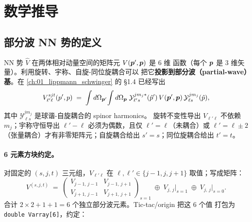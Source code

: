 \section{数学推导}
\label{sec:ch08-math}

\subsection{部分波 NN 势的定义}
\label{subsec:ch08-pw-NN-def}

NN 势 \(\hat{V}\) 在两体相对动量空间的矩阵元 \(V(\bm{p}', \bm{p})\) 是 6 维
函数（每个 \(\bm{p}\) 是 3 维矢量）。利用旋转、宇称、自旋-同位旋耦合可以
把它\textbf{投影到部分波（partial-wave）基}。在 \cref{ch:01_lippmann_schwinger}
的 §1.4 已经写出
\begin{equation}
\label{eq:ch08-pw-projection}
V_{\ell' \ell}^{s j t}(p', p) \;=\;
\int d\Omega_{\bm{p}'}\!\int d\Omega_{\bm{p}}\;
\mathcal{Y}_{\ell' s}^{j m_j *}(\hat{p}')\,
V(\bm{p}', \bm{p})\,
\mathcal{Y}_{\ell s}^{j m_j}(\hat{p}),
\end{equation}
其中 \(\mathcal{Y}_{\ell s}^{j m_j}\) 是球谐-自旋耦合的 spinor harmonics。
旋转不变性导出 \(V_{\ell' \ell}\) 不依赖 \(m_j\)；宇称守恒导出
\(\ell' - \ell\) 必须为偶数，且仅 \(\ell' = \ell\)（未耦合）或 \(\ell' = \ell \pm 2\)
（张量耦合）才有非零矩阵元；自旋耦合给出 \(s' = s\)；同位旋耦合给出
\(t' = t\)。

\paragraph{6 元素方块约定。}
对固定的 \((s, j, t)\) 三元组，\(V_{\ell' \ell}\) 在 \(\ell, \ell' \in
\{j-1, j, j+1\}\) 取值；写成矩阵：
\begin{equation}
\label{eq:ch08-Vmat-6elements}
V^{(s, j, t)} \;=\;
\begin{pmatrix}
V_{j-1,\,j-1} & V_{j-1,\,j+1} \\
V_{j+1,\,j-1} & V_{j+1,\,j+1}
\end{pmatrix}_{\!\!s=1}
\;\oplus\;
V_{j,\,j}\big|_{s=1}
\;\oplus\;
V_{j,\,j}\big|_{s=0}.
\end{equation}
合计 \(2 \times 2 + 1 + 1 = 6\) 个独立部分波元素。Tic-tac/origin 把这 6 个值
打包为 \texttt{double Varray[6]}，约定：

